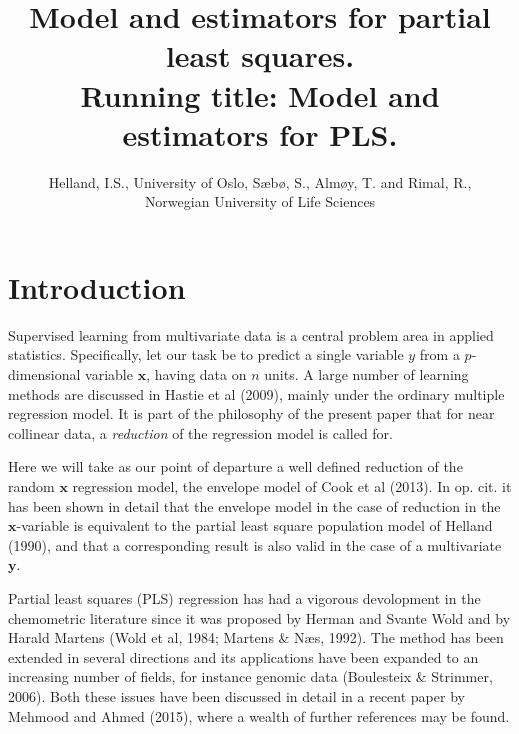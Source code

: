 \documentclass[11pt]{article}
\begin{document}
\title{Model and estimators for partial least squares.\\
Running title: Model and estimators for PLS.}

\author{Helland, I.S., University of Oslo,  S\ae b\o , S., Alm\o y, T.  and Rimal, R.,\\
Norwegian University of Life Sciences}

\maketitle

\begin{abstract}

\end{abstract}

\onehalfspacing
\section{Introduction}

Supervised learning from multivariate data is a central problem area in applied statistics. Specifically, let our task be to predict a single variable $y$ from a 
$p$-dimensional  variable $\bm{x}$, having data on $n$ units. A large number of learning methods are discussed in Hastie et al (2009), mainly under the ordinary multiple regression model. It is part of the philosophy of the present paper that for near collinear data, a \emph{reduction} of the regression model is called for.

Here we will take as our point of departure 
a well defined reduction of the random $\bm{x}$ regression model, the envelope model of Cook et al (2013). In op. cit. it has been shown in detail that the envelope model in the case of reduction in the $\bm{x}$-variable is 
equivalent to the partial least square population model of Helland (1990), and that a corresponding result is also valid in the case of a multivariate $\bm{y}$. 

Partial least squares (PLS) regression has had a vigorous devolopment in the chemometric literature since it was proposed by Herman and Svante Wold and by Harald Martens (Wold et al, 1984; Martens \& N\ae s, 1992). The method has been extended in several directions and its applications have been expanded to an increasing number of fields, for instance genomic data (Boulesteix \& Strimmer, 2006). Both these issues have been discussed in detail in a recent paper by Mehmood and Ahmed (2015), where a wealth of further references may be found.
\end{document}
